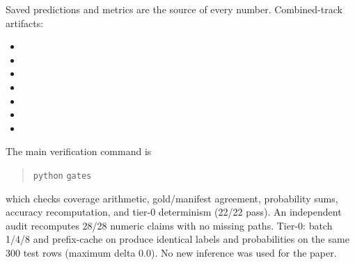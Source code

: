 \documentclass[11pt]{article}
\begin{document}
Saved predictions and metrics are the source of every number. Combined-track artifacts:
\begin{itemize}[leftmargin=1.2em,itemsep=1pt]
  \item {}
  \item {}
  \item {}
  \item {}
  \item {}
  \item {}
  \item {}
\end{itemize}
The main verification command is
\begin{quote}\footnotesize
\texttt{python}  \texttt{gates}
\end{quote}
which checks coverage arithmetic, gold/manifest agreement, probability sums, accuracy recomputation, and tier-0 determinism (22/22 pass). An independent audit recomputes 28/28 numeric claims with no missing paths. Tier-0: batch 1/4/8 and prefix-cache on produce identical labels and probabilities on the same 300 test rows (maximum delta 0.0). No new inference was used for the paper.
\end{document}

